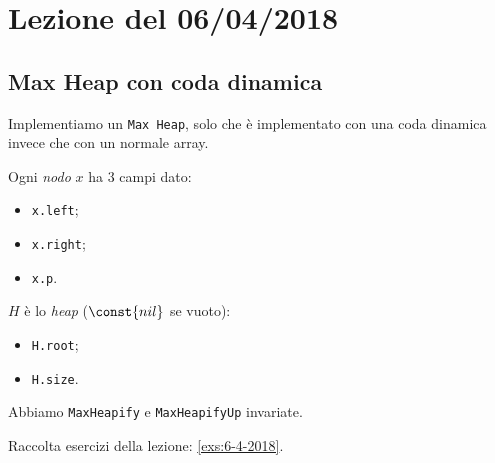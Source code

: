 \section{Lezione del 06/04/2018}

\subsection{Max Heap con coda dinamica}
Implementiamo un \texttt{Max Heap}, solo che è implementato con una
coda dinamica invece che con un normale array.

Ogni \emph{nodo} $x$ ha 3 campi dato:
\begin{itemize}[noitemsep]
    \item \texttt{x.left};
    \item \texttt{x.right};
    \item \texttt{x.p}.
\end{itemize}

$H$ è lo \emph{heap} ($\const{nil}$ se vuoto):
\begin{itemize}[noitemsep]
    \item \texttt{H.root};
    \item \texttt{H.size}.
\end{itemize}

Abbiamo \texttt{MaxHeapify} e \texttt{MaxHeapifyUp} invariate.

 

Raccolta esercizi della lezione: \ref{exs:6-4-2018}.